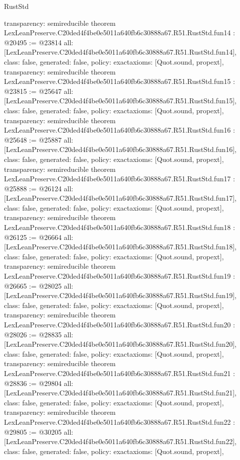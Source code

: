 \begin{lexlean}{RustStd}
\begin{coremodule}
{  transparency: semireducible
}
theorem LexLeanPreserve.C20ded4f4be0e5011a640fb6c30888a67.R51.RustStd.fun14 : @20495 := @23814 {
  all: [LexLeanPreserve.C20ded4f4be0e5011a640fb6c30888a67.R51.RustStd.fun14],
  class: false,
  generated: false,
  policy: exact{axioms: [Quot.sound, propext]},
  transparency: semireducible
}
theorem LexLeanPreserve.C20ded4f4be0e5011a640fb6c30888a67.R51.RustStd.fun15 : @23815 := @25647 {
  all: [LexLeanPreserve.C20ded4f4be0e5011a640fb6c30888a67.R51.RustStd.fun15],
  class: false,
  generated: false,
  policy: exact{axioms: [Quot.sound, propext]},
  transparency: semireducible
}
theorem LexLeanPreserve.C20ded4f4be0e5011a640fb6c30888a67.R51.RustStd.fun16 : @25648 := @25887 {
  all: [LexLeanPreserve.C20ded4f4be0e5011a640fb6c30888a67.R51.RustStd.fun16],
  class: false,
  generated: false,
  policy: exact{axioms: [Quot.sound, propext]},
  transparency: semireducible
}
theorem LexLeanPreserve.C20ded4f4be0e5011a640fb6c30888a67.R51.RustStd.fun17 : @25888 := @26124 {
  all: [LexLeanPreserve.C20ded4f4be0e5011a640fb6c30888a67.R51.RustStd.fun17],
  class: false,
  generated: false,
  policy: exact{axioms: [Quot.sound, propext]},
  transparency: semireducible
}
theorem LexLeanPreserve.C20ded4f4be0e5011a640fb6c30888a67.R51.RustStd.fun18 : @26125 := @26664 {
  all: [LexLeanPreserve.C20ded4f4be0e5011a640fb6c30888a67.R51.RustStd.fun18],
  class: false,
  generated: false,
  policy: exact{axioms: [Quot.sound, propext]},
  transparency: semireducible
}
theorem LexLeanPreserve.C20ded4f4be0e5011a640fb6c30888a67.R51.RustStd.fun19 : @26665 := @28025 {
  all: [LexLeanPreserve.C20ded4f4be0e5011a640fb6c30888a67.R51.RustStd.fun19],
  class: false,
  generated: false,
  policy: exact{axioms: [Quot.sound, propext]},
  transparency: semireducible
}
theorem LexLeanPreserve.C20ded4f4be0e5011a640fb6c30888a67.R51.RustStd.fun20 : @28026 := @28835 {
  all: [LexLeanPreserve.C20ded4f4be0e5011a640fb6c30888a67.R51.RustStd.fun20],
  class: false,
  generated: false,
  policy: exact{axioms: [Quot.sound, propext]},
  transparency: semireducible
}
theorem LexLeanPreserve.C20ded4f4be0e5011a640fb6c30888a67.R51.RustStd.fun21 : @28836 := @29804 {
  all: [LexLeanPreserve.C20ded4f4be0e5011a640fb6c30888a67.R51.RustStd.fun21],
  class: false,
  generated: false,
  policy: exact{axioms: [Quot.sound, propext]},
  transparency: semireducible
}
theorem LexLeanPreserve.C20ded4f4be0e5011a640fb6c30888a67.R51.RustStd.fun22 : @29805 := @30205 {
  all: [LexLeanPreserve.C20ded4f4be0e5011a640fb6c30888a67.R51.RustStd.fun22],
  class: false,
  generated: false,
  policy: exact{axioms: [Quot.sound, propext]},
}
\end{coremodule}
\end{lexlean}
